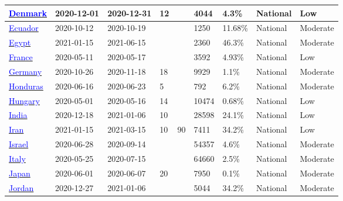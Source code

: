 \begin{table}[!ht]
\begin{center}
\begin{tabular}{p{2cm} | p{1.6cm} | p{1.6cm} | p{0.8cm} | p{0.8cm} | p{1cm} | p{1.3cm} | p{1.2cm} | p{1.2cm}}
\hline 
\href{https://dx.doi.org/10.1007/s10654-021-00796-8}{\textcolor{blue}{Denmark}} & 2020-12-01 & 2020-12-31 & 12 &  & 4044 & 4.3\% & National & Low \\ 
\hline 
\href{https://dx.doi.org/10.3389/fmed.2022.933260}{\textcolor{blue}{Ecuador}} & 2020-10-12 & 2020-10-19 &  &  & 1250 & 11.68\% & National & Moderate \\ 
\hline 
\href{https://dx.doi.org/10.1186/s41182-022-00448-x}{\textcolor{blue}{Egypt}} & 2021-01-15 & 2021-06-15 &  &  & 2360 & 46.3\% & National & Moderate \\ 
\hline 
\href{https://dx.doi.org/10.1038/s41467-021-23233-6}{\textcolor{blue}{France}} & 2020-05-11 & 2020-05-17 &  &  & 3592 & 4.93\% & National & Low \\ 
\hline 
\href{https://www.ifo.de/en/publikationen/2020/monograph-authorship/die-deutschen-und-corona}{\textcolor{blue}{Germany}} & 2020-10-26 & 2020-11-18 & 18 &  & 9929 & 1.1\% & National & Moderate \\ 
\hline 
\href{https://revistas.ucr.ac.cr/index.php/psm/article/view/43261/46175}{\textcolor{blue}{Honduras}} & 2020-06-16 & 2020-06-23 & 5 &  & 792 & 6.2\% & National & Moderate \\ 
\hline 
\href{https://dx.doi.org/10.1007/s11357-020-00226-9}{\textcolor{blue}{Hungary}} & 2020-05-01 & 2020-05-16 & 14 &  & 10474 & 0.68\% & National & Low \\ 
\hline 
\href{http://dx.doi.org/10.1016/j.ijid.2021.05.040}{\textcolor{blue}{India}} & 2020-12-18 & 2021-01-06 & 10 &  & 28598 & 24.1\% & National & Low \\ 
\hline 
\href{https://dx.doi.org/10.1186/s12889-022-13464-7}{\textcolor{blue}{Iran}} & 2021-01-15 & 2021-03-15 & 10 & 90 & 7411 & 34.2\% & National & Low \\ 
\hline 
\href{https://dx.doi.org/10.1007/s10654-021-00749-1}{\textcolor{blue}{Israel}} & 2020-06-28 & 2020-09-14 &  &  & 54357 & 4.6\% & National & Moderate \\ 
\hline 
\href{https://www.istat.it/it/files//2020/08/ReportPrimiRisultatiIndagineSiero.pdf}{\textcolor{blue}{Italy}} & 2020-05-25 & 2020-07-15 &  &  & 64660 & 2.5\% & National & Moderate \\ 
\hline 
\href{https://dx.doi.org/10.3201/eid2702.204088}{\textcolor{blue}{Japan}} & 2020-06-01 & 2020-06-07 & 20 &  & 7950 & 0.1\% & National & Moderate \\ 
\hline 
\href{http://dx.doi.org/10.1016/j.onehlt.2021.100292}{\textcolor{blue}{Jordan}} & 2020-12-27 & 2021-01-06 &  &  & 5044 & 34.2\% & National & Moderate \\ 

\end{tabular}
\end{center}
\end{table}
